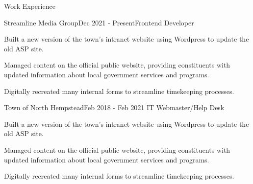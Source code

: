 \documentclass{resume}
\begin{document}
\begin{rSection}{Work Experience}
    \begin{rSubsection}{Streamline Media Group}{Dec 2021 - Present}{Frontend Developer}{}
        \item Built a new version of the town’s intranet website using Wordpress to update the old ASP site.
        \item Managed content on the official public website, providing constituents with updated information about local government services and programs.
        \item Digitally recreated many internal forms to streamline timekeeping processes.
    \end{rSubsection}
    \begin{rSubsection}{Town of North Hempstead}{Feb 2018 - Feb 2021 }{IT Webmaster/Help Desk}{}
        \item Built a new version of the town’s intranet website using Wordpress to update the old ASP site.
        \item Managed content on the official public website, providing constituents with updated information about local government services and programs.
        \item Digitally recreated many internal forms to streamline timekeeping processes.
    \end{rSubsection}

\end{rSection}
\end{document}
